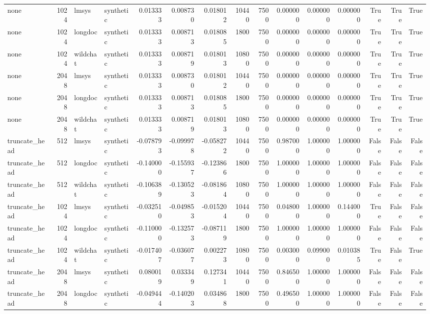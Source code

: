 \begin{tabular}{lrllrrrrrrrrrrr}
none & 1024 & lmsys & synthetic & 0.013333 & 0.008730 & 0.018012 & 10440 & 7500 & 0.000000 & 0.000000 & 0.000000 & True & True & True \\
none & 1024 & longdoc & synthetic & 0.013333 & 0.008713 & 0.018085 & 1800 & 7500 & 0.000000 & 0.000000 & 0.000000 & True & True & True \\
none & 1024 & wildchat & synthetic & 0.013333 & 0.008719 & 0.018013 & 10800 & 7500 & 0.000000 & 0.000000 & 0.000000 & True & True & True \\
none & 2048 & lmsys & synthetic & 0.013333 & 0.008730 & 0.018012 & 10440 & 7500 & 0.000000 & 0.000000 & 0.000000 & True & True & True \\
none & 2048 & longdoc & synthetic & 0.013333 & 0.008713 & 0.018085 & 1800 & 7500 & 0.000000 & 0.000000 & 0.000000 & True & True & True \\
none & 2048 & wildchat & synthetic & 0.013333 & 0.008719 & 0.018013 & 10800 & 7500 & 0.000000 & 0.000000 & 0.000000 & True & True & True \\
truncate_head & 512 & lmsys & synthetic & -0.078793 & -0.099978 & -0.058272 & 10440 & 7500 & 0.987000 & 1.000000 & 1.000000 & False & False & False \\
truncate_head & 512 & longdoc & synthetic & -0.140000 & -0.155937 & -0.123866 & 1800 & 7500 & 1.000000 & 1.000000 & 1.000000 & False & False & False \\
truncate_head & 512 & wildchat & synthetic & -0.106389 & -0.130523 & -0.081864 & 10800 & 7500 & 1.000000 & 1.000000 & 1.000000 & False & False & False \\
truncate_head & 1024 & lmsys & synthetic & -0.032510 & -0.049853 & -0.015204 & 10440 & 7500 & 0.048000 & 1.000000 & 0.144000 & True & False & False \\
truncate_head & 1024 & longdoc & synthetic & -0.110000 & -0.132573 & -0.087119 & 1800 & 7500 & 1.000000 & 1.000000 & 1.000000 & False & False & False \\
truncate_head & 1024 & wildchat & synthetic & -0.017407 & -0.036077 & 0.002273 & 10800 & 7500 & 0.003000 & 0.099000 & 0.010385 & True & False & True \\
truncate_head & 2048 & lmsys & synthetic & 0.080019 & 0.033349 & 0.127341 & 10440 & 7500 & 0.846500 & 1.000000 & 1.000000 & False & False & False \\
truncate_head & 2048 & longdoc & synthetic & -0.049444 & -0.140203 & 0.034868 & 1800 & 7500 & 0.496500 & 1.000000 & 1.000000 & False & False & False \\

\end{tabular}
